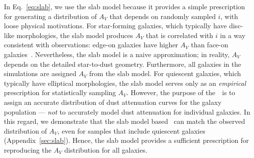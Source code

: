 In Eq.~\ref{eq:slab}, we use the slab model because it provides a simple
prescription for generating a distribution of $A_V$ that depends on
randomly sampled $i$, with loose physical motivations.
For star-forming galaxies, which typically have disc-like morphologies, the
slab model produces $A_V$ that is correlated with $i$ in a way consistent
with observations: edge-on galaxies have higher $A_V$ than face-on
galaxies~\citep[\eg][]{conroy2010, wild2011, battisti2017, salim2020}.
Nevertheless, the slab model is a naive approximation; in reality, $A_V$
depends on the detailed star-to-dust geometry.
Furthermore, all galaxies in the simulations are assigned $A_V$ from the
slab model.
For quiescent galaxies, which typically have elliptical morphologies, the
slab model serves only as an \emph{empirical} prescription for statistically 
sampling $A_V$. 
However, the purpose of the~\eda~is to assign an accurate distribution of dust
attenuation curves for the galaxy population --- \emph{not} to accurately
model dust attenuation for individual galaxies.
In this regard, we demonstrate that the slab model based \eda~can match the
observed distribution of $A_V$, even for samples that include quiescent
galaxies (Appendix~\ref{sec:slab}).
Hence, the slab model provides a sufficient prescription for reproducing
the $A_V$ distribution for all galaxies. 

